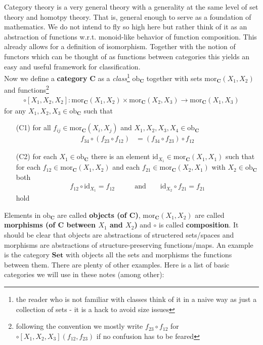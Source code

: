 \nocite{8b5861fc}
Category theory is a very general theory with a generality at the same level of set theory and homotpy theory. That is, general enough to serve as a {\glqq}foundation of mathematics{\grqq}. We do not intend to fly so high here but rather think of it as an abstraction of functions w.r.t. monoid-like behavior of function composition. This already allows for a definition of isomorphism. Together with the notion of functors which can be thought of as functions between categories this yields an easy and useful framework for classification.
\\
Now we define a \textbf{category} $\mathbf{C}$ as a \textit{class}\footnote{the reader who is not familiar with classes think of it in a naive way as just a collection of sets - it is a hack to avoid {\glqq}size issues{\grqq}} $\mathrm{ob}_{\mathbf{C}}$ together with sets $\mathrm{mor}_{\mathbf{C}}(X_{1},X_{2})$ and functions\footnote{following the convention we mostly write $f_{23} \circ f_{12}$ for $\circ[X_{1},X_{2},X_{3}](f_{12},f_{23})$ if no confusion has to be feared}
\begin{align*}
  \circ[X_{1},X_{2},X_{2}]
  \colon
  \mathrm{mor}_{\mathbf{C}}(X_{1},X_{2})
  \times
  \mathrm{mor}_{\mathbf{C}}(X_{2},X_{3})
  \to
  \mathrm{mor}_{\mathbf{C}}(X_{1},X_{3})
\end{align*}
for any $X_{1},X_{2},X_{3} \in \mathrm{ob}_{\mathbf{C}}$ such that
\begin{enumerate}
\item[(C1)]
for all $f_{ij} \in \mathrm{mor}_{\mathbf{C}}(X_{i},X_{j})$ and $X_{1},X_{2},X_{3},X_{4} \in \mathrm{ob}_{\mathbf{C}}$
\begin{align*}
  f_{34}
  \circ
  (f_{23} \circ f_{12})
  &=
  (f_{34} \circ f_{23})
  \circ
  f_{12}
\end{align*}
\item[(C2)]
for each $X_{1} \in \mathrm{ob}_{\mathbf{C}}$ there is an element $\mathrm{id}_{X_{1}} \in \mathrm{mor}_{\mathbf{C}}(X_{1},X_{1})$ such that for each $f_{12} \in \mathrm{mor}_{\mathbf{C}}(X_{1},X_{2})$ and each $f_{21} \in \mathrm{mor}_{\mathbf{C}}(X_{2},X_{1})$ with $X_{2} \in \mathrm{ob}_{\mathbf{C}}$ both
\begin{align*}
  f_{12}
  \circ
  \mathrm{id}_{X_{1}}
  =
  f_{12}
  \qquad
  &\text{and}
  \qquad
  \mathrm{id}_{X_{2}}
  \circ
  f_{21}
  =
  f_{21}
\end{align*}
hold
\end{enumerate}
Elements in $\mathrm{ob}_{\mathbf{C}}$ are called \textbf{objects (of $\mathbf{C}$)}, $\mathrm{mor}_{\mathbf{C}}(X_{1},X_{2})$ are called \textbf{morphisms (of $\mathbf{C}$ between $X_{1}$ and $X_{2}$)} and $\circ$ is called \textbf{composition}. It should be clear that objects are abstractions of structered sets/spaces and morphisms are abstractions of structure-preserving functions/maps. An example is the category $\mathbf{Set}$ with objects all the sets and morphisms the functions between them. There are plenty of other examples. Here is a list of basic categories we will use in these notes (among other):
